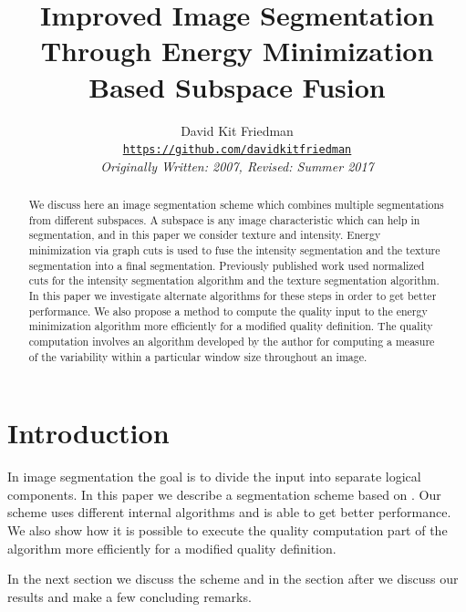\documentclass[twocolumn]{article}
\begin{document}
\title{Improved Image Segmentation Through Energy Minimization Based
Subspace Fusion}

\author{David Kit Friedman\\
\href{https://github.com/davidkitfriedman}{\texttt{https://github.com/davidkitfriedman}}\\
\textit{Originally Written: 2007, Revised: Summer 2017}
}


\date{}
\maketitle

\thispagestyle{fancy}

\begin{abstract}

We discuss here an image segmentation scheme which combines multiple segmentations
from different subspaces. A subspace is any image characteristic which can help in 
segmentation, and in this paper we consider texture and intensity. Energy minimization via
graph cuts is used to fuse the intensity segmentation and the texture segmentation into a 
final segmentation. Previously published work used normalized cuts for the intensity 
segmentation algorithm and the texture segmentation algorithm. In this paper we 
investigate alternate algorithms for these steps in order to get better performance. 
We also propose a method to compute the quality input to the energy minimization 
algorithm more efficiently for a modified quality definition. The quality
computation involves an algorithm developed by the author for computing a 
measure of the variability within a particular window size 
throughout an image. 
\end{abstract}



\section{Introduction}

In image segmentation the goal is to divide the input into separate
logical components. In this paper we describe a segmentation scheme
based on \cite{prev}. Our scheme uses different internal algorithms and is
able to get better performance. We also show how it is possible to
execute the quality computation part of the algorithm more efficiently
for a modified quality definition. 

In the next section we discuss the scheme and in the section
after we discuss our results and make a few concluding
remarks. 
\end{document}

